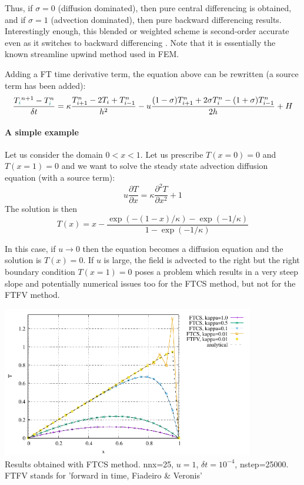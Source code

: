 Thus, if $\sigma = 0$ (diffusion dominated), then pure central differencing is obtained, and if
$\sigma = 1$ (advection dominated), then pure backward differencing results. Interestingly
enough, this blended or weighted scheme is second-order accurate even as it switches
to backward differencing \cite{five77}. 
Note that it is essentially the known streamline upwind method used in FEM.

Adding a FT time derivative term, the equation above can be rewritten (a source
term has been added):
\[
\frac{T_{\color{teal}i}^{n+1}-T^n_{\color{teal}i}}{\delta t} 
=
\kappa \frac{T_{i+1}^n-2T_i + T_{i-1}^n}{h^2}
- u \frac{(1-\sigma) T_{i+1}^n+2\sigma T_i^n -(1+\sigma)T_{i-1}^n}{2 h} +H 
\]



\paragraph{A simple example} Let us consider the domain $0<x<1$.
Let us prescribe $T(x=0)=0$  and $T(x=1)=0$ and we want to solve 
the steady state advection diffusion equation (with a source term):
\begin{equation}
u \frac{\partial T}{\partial x} = \kappa \frac{\partial^2 T}{\partial x^2} + 1
\label{eq:fdmadvdiff2}
\end{equation}
The solution is then 
\begin{equation}
T(x)=x - \frac{\exp (-(1-x)/\kappa) -\exp (-1/\kappa)  }{1-\exp (-1/\kappa)}
\label{eq:fdmadvdiff1}
\end{equation}

In this case, if $u\rightarrow 0$ then the equation becomes a diffusion equation
and the solution is $T(x)=0$. If $u$ is large, the field is advected to the right
but the right boundary condition $T(x=1)=0$ poses a problem which results in a very steep slope
and potentially numerical issues too for the FTCS method, but not for the FTFV method.

\begin{center}
\includegraphics[width=11cm]{images/fdm/adv_diff/T.pdf}\\
{\captionfont Results obtained with FTCS method. nnx=25, $u=1$, $\delta t=10^{-4}$, 
nstep=25000. FTFV stands for 'forward in time, Fiadeiro \& Veronis'}
\end{center}

